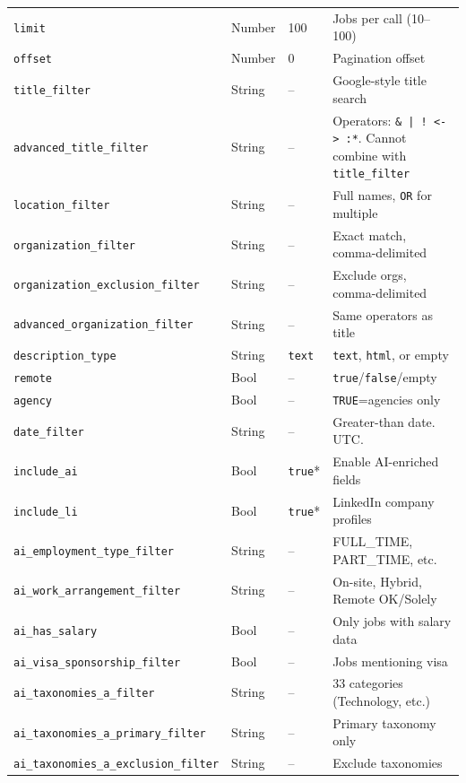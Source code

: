 \documentclass[11pt, a4paper]{article}
\begin{document}
{\begin{longtable}{|L{5.2cm}|C{1.2cm}|C{1.2cm}|L{7cm}|}
\texttt{limit} & Number & 100 & Jobs per call (10--100) \\
\texttt{offset} & Number & 0 & Pagination offset \\
\texttt{title\_filter} & String & -- & Google-style title search \\
\texttt{advanced\_title\_filter} & String & -- & Operators: \texttt{\& | ! <-> :*}. Cannot combine with \texttt{title\_filter} \\
\texttt{location\_filter} & String & -- & Full names, \texttt{OR} for multiple \\
\texttt{organization\_filter} & String & -- & Exact match, comma-delimited \\
\texttt{organization\_exclusion\_filter} & String & -- & Exclude orgs, comma-delimited \\
\texttt{advanced\_organization\_filter} & String & -- & Same operators as title \\
\texttt{description\_type} & String & \texttt{text} & \texttt{text}, \texttt{html}, or empty \\
\texttt{remote} & Bool & -- & \texttt{true}/\texttt{false}/empty \\
\texttt{agency} & Bool & -- & \texttt{TRUE}=agencies only \\
\texttt{date\_filter} & String & -- & Greater-than date. UTC. \\
\texttt{include\_ai} & Bool & \texttt{true}* & Enable AI-enriched fields \\
\texttt{include\_li} & Bool & \texttt{true}* & LinkedIn company profiles \\
\texttt{ai\_employment\_type\_filter} & String & -- & FULL\_TIME, PART\_TIME, etc. \\
\texttt{ai\_work\_arrangement\_filter} & String & -- & On-site, Hybrid, Remote OK/Solely \\
\texttt{ai\_has\_salary} & Bool & -- & Only jobs with salary data \\
\texttt{ai\_visa\_sponsorship\_filter} & Bool & -- & Jobs mentioning visa \\
\texttt{ai\_taxonomies\_a\_filter} & String & -- & 33 categories (Technology, etc.) \\
\texttt{ai\_taxonomies\_a\_primary\_filter} & String & -- & Primary taxonomy only \\
\texttt{ai\_taxonomies\_a\_exclusion\_filter} & String & -- & Exclude taxonomies \\

\end{longtable}}
\end{document}
